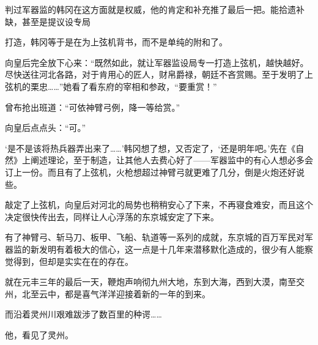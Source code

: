 判过军器监的韩冈在这方面就是权威，他的肯定和补充推了最后一把。能拾遗补缺，甚至是提议设专局

打造，韩冈等于是在为上弦机背书，而不是单纯的附和了。

向皇后完全放下心来：“既然如此，就让军器监设局专一打造上弦机，越快越好。尽快送往河北各路，对于肯用心的匠人，财帛爵禄，朝廷不吝赏赐。至于发明了上弦机的栗忠……”她看了看东府的宰相和参政，“要重赏！”

曾布抢出班道：“可依神臂弓例，降一等给赏。”

向皇后点点头：“可。”

‘是不是该将热兵器弄出来了……’韩冈想了想，又否定了，‘还是明年吧。’先在《自然》上阐述理论，至于制造，让其他人去费心好了——军器监中的有心人想必多会订上一份。而且有了上弦机，火枪想超过神臂弓就更难了几分，倒是火炮还好说些。

敲定了上弦机，向皇后对河北的局势也稍稍安心了下来，不再寝食难安，而且这个决定很快传出去，同样让人心浮荡的东京城安定了下来。

有了神臂弓、斩马刀、板甲、飞船、轨道等一系列的成就，东京城的百万军民对军器监的新发明有着极大的信心，这一点是十几年来潜移默化造成的，很少有人能察觉得到，但却是实实在在的存在。

就在元丰三年的最后一天，鞭炮声响彻九州大地，东到大海，西到大漠，南至交州，北至云中，都是喜气洋洋迎接着新的一年的到来。

而沿着灵州川艰难跋涉了数百里的种谔……

他，看见了灵州。

